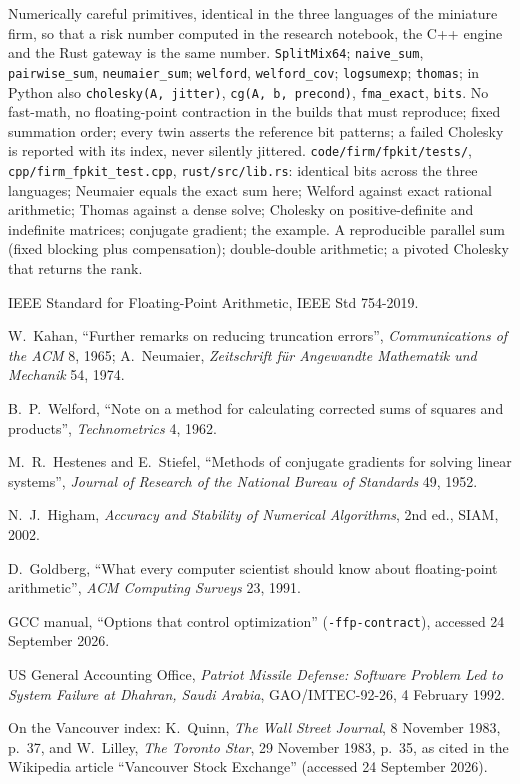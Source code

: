 \begin{build}
 Numerically careful primitives, identical in the three languages of the miniature firm, so that a risk number computed in the research notebook, the C++ engine and the Rust
gateway is the same number.
 \texttt{SplitMix64}; \texttt{naive\_sum}, \texttt{pairwise\_sum}, \texttt{neumaier\_sum}; \texttt{welford}, \texttt{welford\_cov}; \texttt{logsumexp}; \texttt{thomas}; in Python also
\texttt{cholesky(A, jitter)}, \texttt{cg(A, b, precond)}, \texttt{fma\_exact}, \texttt{bits}.
 No fast-math, no floating-point contraction in the builds that must reproduce; fixed summation order; every twin asserts the reference bit patterns; a failed Cholesky is reported with its
index, never silently jittered.
 \texttt{code/firm/fpkit/tests/}, \texttt{cpp/firm\_fpkit\_test.cpp}, \texttt{rust/src/lib.rs}: identical bits across the three languages; Neumaier equals the exact sum here;
Welford against exact rational arithmetic; Thomas against a dense solve; Cholesky on positive-definite and indefinite matrices; conjugate gradient; the  example.
 A reproducible parallel sum (fixed blocking plus compensation); double-double arithmetic; a pivoted Cholesky that returns the rank.
\end{build}

\begin{omsources}
\item IEEE Standard for Floating-Point Arithmetic, IEEE Std 754-2019.
\item W.~Kahan, ``Further remarks on reducing truncation errors'', \emph{Communications of the ACM} 8, 1965; A.~Neumaier, \emph{Zeitschrift für Angewandte Mathematik und Mechanik} 54, 1974.
\item B.~P.~Welford, ``Note on a method for calculating corrected sums of squares and products'', \emph{Technometrics} 4, 1962.
\item M.~R.~Hestenes and E.~Stiefel, ``Methods of conjugate gradients for solving linear systems'', \emph{Journal of Research of the National Bureau of Standards} 49, 1952.
\item N.~J.~Higham, \emph{Accuracy and Stability of Numerical Algorithms}, 2nd ed., SIAM, 2002.
\item D.~Goldberg, ``What every computer scientist should know about floating-point arithmetic'', \emph{ACM Computing Surveys} 23, 1991.
\item GCC manual, ``Options that control optimization'' (\texttt{-ffp-contract}), accessed 24 September 2026.
\item US General Accounting Office, \emph{Patriot Missile Defense: Software Problem Led to System Failure at Dhahran, Saudi Arabia}, GAO/IMTEC-92-26, 4 February 1992.
\item On the Vancouver index: K.~Quinn, \emph{The Wall Street Journal}, 8 November 1983, p.~37, and W.~Lilley, \emph{The Toronto Star}, 29 November 1983, p.~35, as cited in the Wikipedia article
``Vancouver Stock Exchange'' (accessed 24 September 2026).
\end{omsources}

